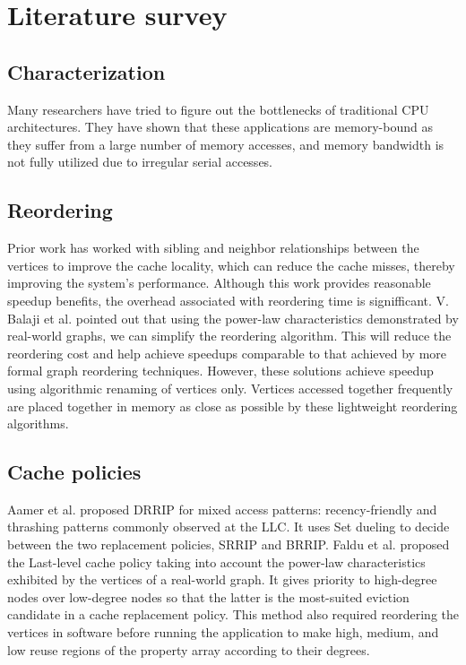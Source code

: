 \documentclass[a4paper,12pt, final]{report}
\begin{document}
\section{Literature survey}
\subsection{Characterization}
Many researchers have tried to figure out the bottlenecks of traditional CPU architectures. They 
have shown that these applications are memory-bound as they suffer
from a large number of memory accesses, and memory bandwidth is not fully utilized due
to irregular serial accesses.

\subsection{Reordering}
Prior work has worked with sibling and neighbor relationships between the vertices
to improve the cache locality, which can reduce the cache misses, thereby improving the
system's performance. Although this work provides reasonable speedup benefits, the
overhead associated with reordering time is signifficant. V. Balaji et al. \cite{poptcite8} pointed
out that using the power-law characteristics demonstrated by real-world graphs, we can
simplify the reordering algorithm. This will reduce the reordering cost and help achieve
speedups comparable to that achieved by more formal graph reordering techniques. However, these solutions achieve speedup using algorithmic renaming of vertices only. Vertices
accessed together frequently are placed together in memory as close as possible by these
lightweight reordering algorithms.

\subsection{Cache policies}
Aamer et al. proposed DRRIP\cite{DRRIP} for mixed access patterns: recency-friendly and
thrashing patterns commonly observed at the LLC. It uses Set dueling to decide
between the two replacement policies, SRRIP and BRRIP. Faldu et al. \cite{cite7} proposed the
Last-level cache policy taking into account the power-law characteristics exhibited by
the vertices of a real-world graph. It gives priority to high-degree nodes over low-degree
nodes so that the latter is the most-suited eviction candidate in a cache replacement
policy. This method also required reordering the vertices in software before running the
application to make high, medium, and low reuse regions of the property array according
to their degrees.
\end{document}

